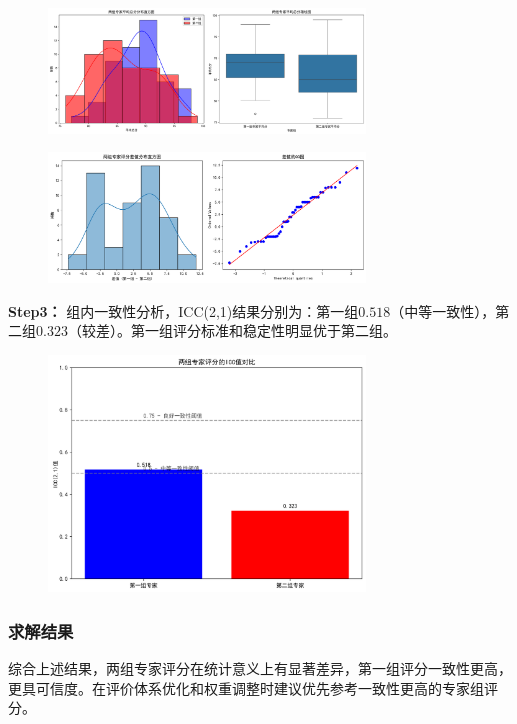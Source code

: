 \documentclass[withoutpreface,bwprint]{cumcmthesis}
\begin{document}
\begin{figure}[ht]
\centering
\includegraphics[width=0.75\textwidth]{figures/descriptive_statistics.png}
\label{fig:单图}
\end{figure}

\begin{figure}[ht]
\centering
\includegraphics[width=0.75\textwidth]{figures/normality_test.png}
\label{fig:单图}
\end{figure}

\textbf{Step3：} 组内一致性分析，ICC(2,1)结果分别为：第一组$0.518$（中等一致性），第二组$0.323$（较差）。第一组评分标准和稳定性明显优于第二组。


\begin{figure}[H]
\centering
\includegraphics[width=0.75\textwidth]{figures/icc_analysis.png}
\label{fig:单图}
\end{figure}

\subsubsection{求解结果}
综合上述结果，两组专家评分在统计意义上有显著差异，第一组评分一致性更高，更具可信度。在评价体系优化和权重调整时建议优先参考一致性更高的专家组评分。
\end{document}
